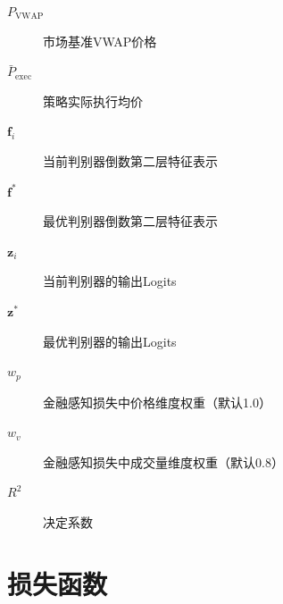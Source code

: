 \begin{description}
\item[$P_{\mathrm{VWAP}}$] 市场基准VWAP价格
\item[$\bar{P}_{\mathrm{exec}}$] 策略实际执行均价
\item[$\mathbf{f}_i$] 当前判别器倒数第二层特征表示
\item[$\mathbf{f}^*$] 最优判别器倒数第二层特征表示
\item[$\mathbf{z}_i$] 当前判别器的输出Logits
\item[$\mathbf{z}^*$] 最优判别器的输出Logits
\item[$w_p$] 金融感知损失中价格维度权重（默认1.0）
\item[$w_v$] 金融感知损失中成交量维度权重（默认0.8）
\item[$R^2$] 决定系数

\end{description}

\section*{损失函数}

